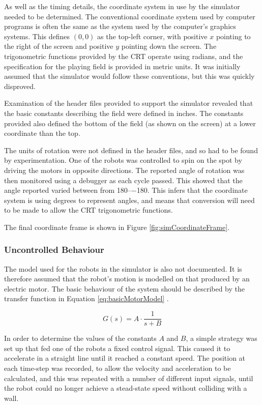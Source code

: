 \documentclass[10pt]{article}
\begin{document}
As well as the timing details, the coordinate system in use by the simulator
needed to be determined.  The conventional coordinate system used by computer
programs is often the same as the system used by the computer's graphics
systems. This defines $\left(0,0\right)$ as the top-left corner, with positive
$x$ pointing to the right of the screen and positive $y$ pointing down the
screen. The trigonometric functions provided by the CRT operate using
radians, and the specification for the playing field is provided in metric
units.  It was initially assumed that the simulator would follow these
conventions, but this was quickly disproved.

Examination of the header files provided to support the simulator revealed that
the basic constants describing the field were defined in inches. The constants
provided also defined the bottom of the field (as shown on the screen) at a
lower coordinate than the top.

The units of rotation were not defined in the header files, and so had to be
found by experimentation.  One of the robots was controlled to spin on the spot
by driving the motors in opposite directions.  The reported angle of rotation
was then monitored using a debugger as each cycle passed.  This showed that the
angle reported varied between from \numrange{+180}{-180}.  This infers that the
coordinate system is using degrees to represent angles, and means that
conversion will need to be made to allow the CRT trigonometric functions.

The final coordinate frame is shown in Figure \ref{fig:simCoordinateFrame}.

\subsubsection{Uncontrolled Behaviour}

The model used for the robots in the simulator is also not documented. It is
therefore assumed that the robot's motion is modelled on that produced by an
electric motor. The basic behaviour of the system should be described by the
transfer function in Equation \ref{eq:basicMotorModel} \cite{basicControlNotes}.

\begin{equation}
 \label{eq:basicMotorModel}
 G\left(s\right) = A \cdot \frac{1}{s+B}
\end{equation}

In order to determine the values of the constants $A$ and $B$, a simple strategy
was set up that fed one of the robots a fixed control signal.  This caused it to
accelerate in a straight line until it reached a constant speed.  The position
at each time-step was recorded, to allow the velocity and acceleration to be
calculated, and this was repeated with a number of different input signals,
until the robot could no longer achieve a stead-state speed without colliding
with a wall.
\end{document}
